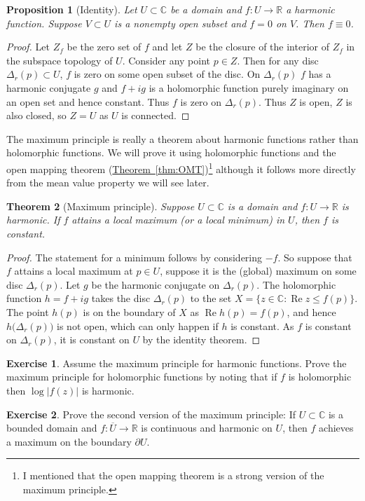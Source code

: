 \documentclass[12pt,openany]{book}
\renewcommand{\Re}{\operatorname{Re}}
\newcommand{\sabs}[1]{\lvert {#1} \rvert}
\newcommand{\C}{{\mathbb{C}}}
\newcommand{\R}{{\mathbb{R}}}
\theoremstyle{plain}
\newtheorem{thm}{Theorem}[section]
\newtheorem{prop}[thm]{Proposition}
\theoremstyle{remark}
\theoremstyle{definition}
\newenvironment{exbox}{%
    \def\FrameCommand{\vrule width 1pt \relax\hspace{10pt}}%
    \MakeFramed{\advance\hsize-\width\FrameRestore}%
}{%
    \endMakeFramed
}
\theoremstyle{exercise}
\newtheorem{exercise}{Exercise}[section]
\theoremstyle{example}
\newcommand{\thmref}[1]{\hyperref[#1]{Theorem~\ref*{#1}}}
\begin{document}
\begin{prop}[Identity]
Let $U \subset \C$ be a domain and $f \colon U \to \R$ a harmonic function.
Suppose $V \subset U$ is a nonempty open subset and $f = 0$ on $V$.  Then $f
\equiv 0$.
\end{prop}

\begin{proof}
Let $Z_f$ be the zero set of $f$ and let $Z$ be the closure of the interior
of $Z_f$ in the subspace topology of $U$.
Consider any point $p \in Z$.  Then for any disc $\Delta_r(p) \subset U$, $f$ is
zero on some open subset of the disc.  On $\Delta_r(p)$ $f$ has a harmonic
conjugate $g$ and $f+i g$ is a holomorphic function purely imaginary on an
open set and hence constant.  Thus $f$ is zero on $\Delta_r(p)$.  Thus $Z$
is open, $Z$ is also closed, so $Z=U$ as $U$ is connected.
\end{proof}

The maximum principle is really a theorem about harmonic functions rather
than holomorphic functions.  We will prove it using holomorphic functions
and the open mapping theorem (\thmref{thm:OMT})\footnote{I mentioned that
the open mapping theorem is a strong version of the maximum principle.}
although it follows more directly from the mean value property we will see
later.

\begin{thm}[Maximum principle]
%
Suppose $U \subset \C$ is a domain and $f \colon U \to \R$
is harmonic.  If $f$ attains a local maximum (or a local minimum) in $U$, then $f$ is constant.
\end{thm}

\begin{proof}
The statement for a minimum follows by considering $-f$.  So suppose that
$f$ attains a local maximum at $p \in U$, suppose it is the (global)
maximum on some disc $\Delta_r(p)$.  Let $g$ be the harmonic conjugate on
$\Delta_r(p)$.  The holomorphic function $h = f+ig$ takes the disc
$\Delta_r(p)$ to the set $X = \{ z \in \C : \Re z \leq f(p) \}$.  The
point $h(p)$ is on the boundary of $X$ as $\Re h(p)= f(p)$, and hence
$h\bigl(\Delta_r(p)\bigr)$ is not open, which can only happen if $h$ is
constant.  As $f$ is constant on $\Delta_r(p)$, it is constant on $U$ by the
identity theorem.
\end{proof}

\begin{exbox}
\begin{exercise}
Assume the maximum principle for harmonic functions.  Prove the maximum
principle for holomorphic functions by noting that if $f$ is holomorphic
then $\log \sabs{f(z)}$ is harmonic.
\end{exercise}

\begin{exercise}
Prove the second version of the maximum principle: If $U \subset \C$
is a bounded domain and $f \colon \overline{U}
\to \R$ is continuous and harmonic on $U$, then $f$ achieves a maximum
on the boundary $\partial U$.
\end{exercise}
\end{exbox}
\end{document}
